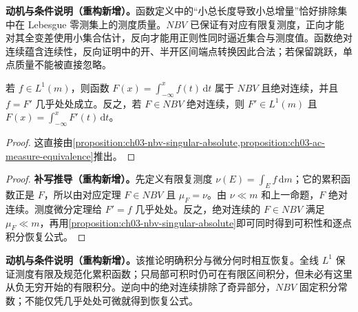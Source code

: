 \documentclass[../../main.tex]{subfiles}%
\begin{document}
\begin{remark}
\textbf{动机与条件说明（重构新增）。}函数定义中的“小总长度导致小总增量”恰好排除集中在 Lebesgue 零测集上的测度质量。$NBV$ 已保证有对应有限复测度，正向才能对其全变差使用小集合估计，反向才能用正则性同时逼近集合与测度值。函数绝对连续蕴含连续性，反向证明中的开、半开区间端点转换因此合法；若保留跳跃，单点质量不能被直接忽略。
\end{remark}

\begin{corollary}\label{corollary:ch03-indefinite-integral}
若 $f\in L^1(m)$，则函数 $F(x)=\int_{-\infty}^xf(t)\,\mathrm dt$ 属于 $NBV$ 且绝对连续，并且 $f=F'$ 几乎处处成立。反之，若 $F\in NBV$ 绝对连续，则 $F'\in L^1(m)$ 且 $F(x)=\int_{-\infty}^xF'(t)\,\mathrm dt$。
\end{corollary}
\begin{proof}
这直接由\cref{proposition:ch03-nbv-singular-absolute,proposition:ch03-ac-measure-equivalence}推出。
\end{proof}
\begin{proof}
\textbf{补写推导（重构新增）。}先定义有限复测度 $\nu(E)=\int_Ef\,\mathrm dm$；它的累积函数正是 $F$，所以由对应定理 $F\in NBV$ 且 $\mu_F=\nu$。由 $\nu\ll m$ 和上一命题，$F$ 绝对连续。测度微分定理给 $F'=f$ 几乎处处。反之，绝对连续的 $F\in NBV$ 满足 $\mu_F\ll m$，再用\cref{proposition:ch03-nbv-singular-absolute}即可同时得到可积性和逐点积分恢复公式。
\end{proof}
\begin{remark}
\textbf{动机与条件说明（重构新增）。}该推论明确积分与微分何时相互恢复。全线 $L^1$ 保证测度有限及规范化累积函数；只局部可积时仍可在有限区间积分，但未必有这里从负无穷开始的有限积分。逆向中的绝对连续排除了奇异部分，$NBV$ 固定积分常数；不能仅凭几乎处处可微就得到恢复公式。
\end{remark}
\end{document}
